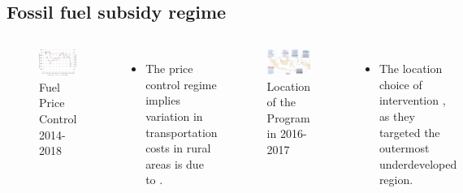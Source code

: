 \documentclass[
11pt,notheorems,compress,hyperref={pdfauthor=Maghfira Ramadhani}
]{beamer}
\begin{document}
\subsection{Fossil fuel subsidy regime}
\begin{frame}
    \begin{columns}[T,onlytextwidth]
      \begin{figure}[t]
        \includegraphics[scale=0.52]{Final_Project/image/bbm-price-2014-2018.jpg}
        \caption{Fuel Price Control 2014-2018}
        \label{f:graph1}
        \end{figure}
        \begin{itemize}
            \item The price control regime implies variation in transportation costs in rural areas is due to .
        \end{itemize}
        \begin{figure}[t]
        \includegraphics[scale=0.305]{Final_Project/image/BBM Satu Harga.png}
        \caption{Location of the Program in 2016-2017}
        \label{f:graph2}
        \end{figure}
        \begin{itemize}
            \item The location choice of intervention , as they targeted the outermost underdeveloped region.
        \end{itemize}
    \end{columns}
\end{frame}
\end{document}
